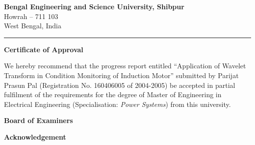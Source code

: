 \documentclass[a4paper,11pt]{article}
\begin{document}
\thispagestyle{empty}
\vspace*{7mm}
\begin{center}
{\Large \textbf{Bengal Engineering and Science University, Shibpur}}\\
\vspace{3.5pt}
{\large Howrah -- 711 103}\\
\vspace{3.5pt}
{\large West Bengal, India}
\end{center}
\hrule

\vspace{25mm}
\begin{center}
{\Large \textbf{Certificate of Approval}}
\end{center}

\noindent We hereby recommend that the progress report entitled ``Application of Wavelet Transform in Condition Monitoring of Induction Motor'' submitted by Parijat Prasun Pal (Registration No. 160406005 of 2004-2005) be accepted in partial fulfilment of the requirements for the degree of Master of Engineering in Electrical Engineering (Specialisation: \emph{Power Systems}) from this university.

\vspace{25mm}
\hspace*{90mm} \textbf{Board of Examiners}

\vspace{40pt}
\hspace*{90mm} \dotfill
\vspace{20pt}
\hspace*{90mm} \dotfill
\vspace{20pt}
\hspace*{90mm} \dotfill

\clearpage
 
\thispagestyle{empty}
\vspace*{65mm}
\begin{center}
{\Large \textbf{Acknowledgement}}
\end{center}
\end{document}
